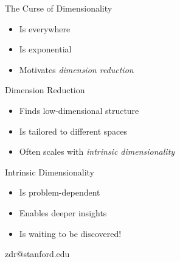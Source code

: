 \documentclass[14pt]{beamer}
\begin{document}

\begin{frame}{The Curse of Dimensionality}
  \begin{itemize}
  \item Is everywhere
  \item Is exponential
  \item Motivates \emph{dimension reduction}
  \end{itemize}
\end{frame}

\begin{frame}{Dimension Reduction}
  \begin{itemize}
  \item Finds low-dimensional structure
  \item Is tailored to different spaces
  \item Often scales with \emph{intrinsic dimensionality}
  \end{itemize}
\end{frame}

\begin{frame}{Intrinsic Dimensionality}
  \begin{itemize}
  \item Is problem-dependent
  \item Enables deeper insights
  \item Is waiting to be discovered!
  \end{itemize}

  \bigskip\centering zdr@stanford.edu
\end{frame}
\end{document}
